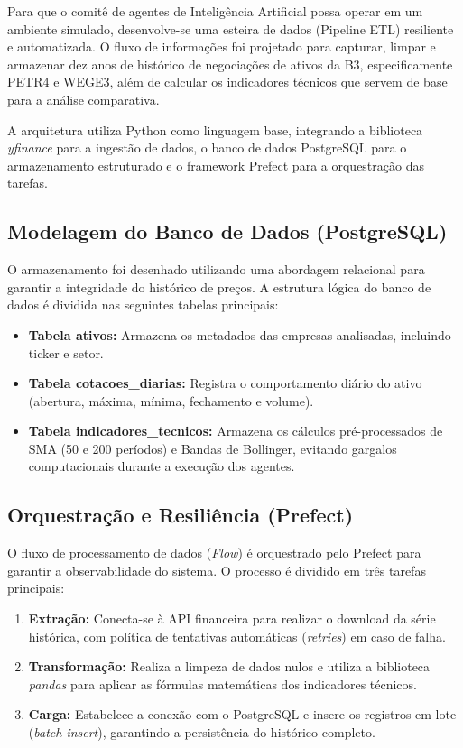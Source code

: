 \documentclass{eic-bcc-tcc}
\begin{document}
Para que o comitê de agentes de Inteligência Artificial possa operar em um ambiente simulado, desenvolve-se uma esteira de dados (Pipeline ETL) resiliente e automatizada. O fluxo de informações foi projetado para capturar, limpar e armazenar dez anos de histórico de negociações de ativos da B3, especificamente PETR4 e WEGE3, além de calcular os indicadores técnicos que servem de base para a análise comparativa.

A arquitetura utiliza Python como linguagem base, integrando a biblioteca \textit{yfinance} para a ingestão de dados, o banco de dados PostgreSQL para o armazenamento estruturado e o framework Prefect para a orquestração das tarefas.

\subsection{Modelagem do Banco de Dados (PostgreSQL)}

O armazenamento foi desenhado utilizando uma abordagem relacional para garantir a integridade do histórico de preços. A estrutura lógica do banco de dados é dividida nas seguintes tabelas principais:

\begin{itemize}
    \item \textbf{Tabela ativos:} Armazena os metadados das empresas analisadas, incluindo ticker e setor.
    \item \textbf{Tabela cotacoes\_diarias:} Registra o comportamento diário do ativo (abertura, máxima, mínima, fechamento e volume).
    \item \textbf{Tabela indicadores\_tecnicos:} Armazena os cálculos pré-processados de SMA (50 e 200 períodos) e Bandas de Bollinger, evitando gargalos computacionais durante a execução dos agentes.
\end{itemize}

\subsection{Orquestração e Resiliência (Prefect)}

O fluxo de processamento de dados (\textit{Flow}) é orquestrado pelo Prefect para garantir a observabilidade do sistema. O processo é dividido em três tarefas principais:

\begin{enumerate}
    \item \textbf{Extração:} Conecta-se à API financeira para realizar o download da série histórica, com política de tentativas automáticas (\textit{retries}) em caso de falha.
    \item \textbf{Transformação:} Realiza a limpeza de dados nulos e utiliza a biblioteca \textit{pandas} para aplicar as fórmulas matemáticas dos indicadores técnicos.
    \item \textbf{Carga:} Estabelece a conexão com o PostgreSQL e insere os registros em lote (\textit{batch insert}), garantindo a persistência do histórico completo.
\end{enumerate}
\end{document}
